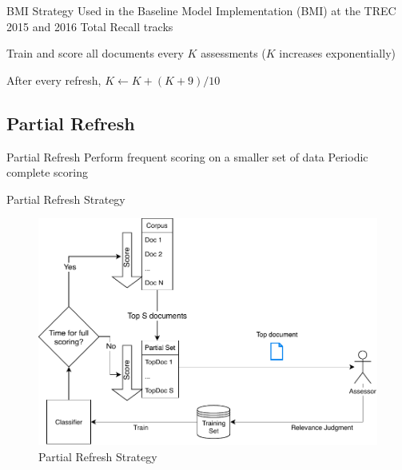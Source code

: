 \documentclass[14pt]{beamer}
\begin{document}
\begin{frame}{BMI Strategy}
Used in the Baseline Model Implementation (BMI) at the TREC 2015 and 2016 Total
Recall tracks

\vskip 1cm
Train and score all documents every $K$ assessments ($K$ increases exponentially)

\vskip 1cm
After every refresh,
$K← K + (K + 9)/10$
\begin{figure}
\end{figure}
\end{frame}

\subsection{Partial Refresh}
\begin{frame}{Partial Refresh}
Perform frequent scoring on a smaller set of data
\vskip 0.7cm
Periodic complete scoring

 
\end{frame}


\begin{frame}{Partial Refresh Strategy}
\begin{figure}
 \centering 
 \includegraphics[width=1.0\textwidth]{animation/partial.pdf}
 \caption{Partial Refresh Strategy}
\end{figure}
\end{frame}
\end{document}
